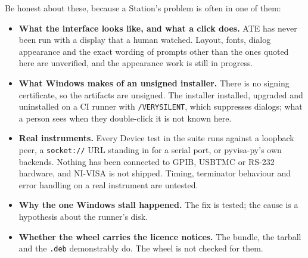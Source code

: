 Be honest about these, because a Station's problem is often in one of them:

\begin{itemize}
  \item \textbf{What the interface looks like, and what a click does.} ATE has never been run with a
    display that a human watched. Layout, fonts, dialog appearance and the exact wording of prompts
    other than the ones quoted here are unverified, and the appearance work is still in progress.
  \item \textbf{What Windows makes of an unsigned installer.} There is no signing certificate, so the
    artifacts are unsigned. The installer installed, upgraded and uninstalled on a CI runner with
    \texttt{/VERYSILENT}, which suppresses dialogs; what a person sees when they double-click it is
    not known here.
  \item \textbf{Real instruments.} Every Device test in the suite runs against a loopback peer, a
    \texttt{socket://} URL standing in for a serial port, or pyvisa-py's own backends. Nothing has
    been connected to GPIB, USBTMC or RS-232 hardware, and NI-VISA is not shipped. Timing,
    terminator behaviour and error handling on a real instrument are untested.
  \item \textbf{Why the one Windows stall happened.} The fix is tested; the cause is a hypothesis
    about the runner's disk.
  \item \textbf{Whether the wheel carries the licence notices.} The bundle, the tarball and the
    \texttt{.deb} demonstrably do. The wheel is not checked for them.
\end{itemize}

